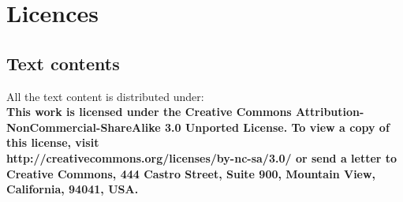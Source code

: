 \newpage

\section*{Licences}

\subsection*{Text contents}
All the text content is distributed under:\\
\textbf{
This work is licensed under the Creative Commons
Attribution-NonCommercial-ShareAlike 3.0 Unported License. To view a copy of 
this license, visit \\http://creativecommons.org/licenses/by-nc-sa/3.0/  or send a
letter to Creative Commons, 444 Castro Street, Suite 900, Mountain View, 
California, 94041, USA.} 


